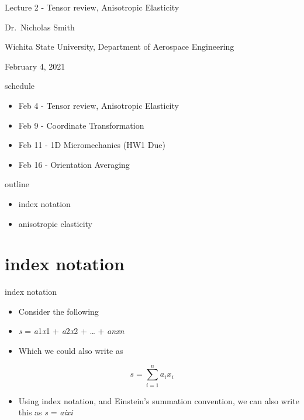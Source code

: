 \documentclass[
  letterpaper,
  ignorenonframetext,
  aspectratio=43,
  handout,
  12pt]{beamer}
\author{}
\date{}
\providecommand{\tightlist}{%
  \setlength{\itemsep}{0pt}\setlength{\parskip}{0pt}}
\providecommand{\tightlist}{%
\setlength{\itemsep}{0pt}\setlength{\parskip}{0pt}}
\begin{document}
\begin{frame}
Lecture 2 - Tensor review, Anisotropic Elasticity

Dr.~Nicholas Smith

Wichita State University, Department of Aerospace Engineering

February 4, 2021
\end{frame}

\begin{frame}{schedule}
\protect\hypertarget{schedule}{}
\begin{itemize}
\tightlist
\item
  Feb 4 - Tensor review, Anisotropic Elasticity
\item
  Feb 9 - Coordinate Transformation
\item
  Feb 11 - 1D Micromechanics (HW1 Due)
\item
  Feb 16 - Orientation Averaging
\end{itemize}
\end{frame}

\begin{frame}{outline}
\protect\hypertarget{outline}{}
\begin{itemize}
\tightlist
\item
  index notation
\item
  anisotropic elasticity
\end{itemize}
\end{frame}

\hypertarget{index-notation}{%
\section{index notation}\label{index-notation}}

\begin{frame}{index notation}
\protect\hypertarget{index-notation-1}{}
\begin{itemize}
\tightlist
\item
  Consider the following
\item
  \emph{s} = \emph{a}1\emph{x}1 + \emph{a}2\emph{x}2 + \ldots{} +
  \emph{a}\emph{n}\emph{x}\emph{n}
\item
  Which we could also write as
\end{itemize}

\[s = \sum_{i=1}^{n}a_ix_i\]

\begin{itemize}
\tightlist
\item
  Using index notation, and Einstein's summation convention, we can also
  write this as \emph{s} = \emph{a}\emph{i}\emph{x}\emph{i}
\end{itemize}
\end{frame}
\end{document}
